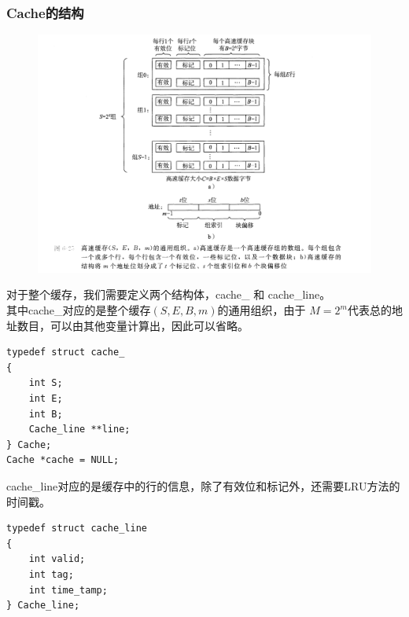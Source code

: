 \documentclass[12pt, a4paper, oneside]{ctexart}
\begin{document}
\subsubsection{Cache的结构}
\noindent
\begin{figure}[htbp]
    \includegraphics[scale=0.31]{image/1-1.png}
\end{figure}
对于整个缓存，我们需要定义两个结构体，cache\_ 和 cache\_line。\\
其中cache\_对应的是整个缓存$(S, E, B, m)$的通用组织，由于
$M=2^m$代表总的地址数目，可以由其他变量计算出，因此可以省略。
\begin{lstlisting}
typedef struct cache_
{
    int S;
    int E;
    int B;
    Cache_line **line;
} Cache;
Cache *cache = NULL;
\end{lstlisting}
cache\_line对应的是缓存中的行的信息，除了有效位和标记外，还需要LRU方法的时间戳。
\begin{lstlisting}
typedef struct cache_line
{
    int valid;     
    int tag;       
    int time_tamp; 
} Cache_line;
\end{lstlisting}
\end{document}
